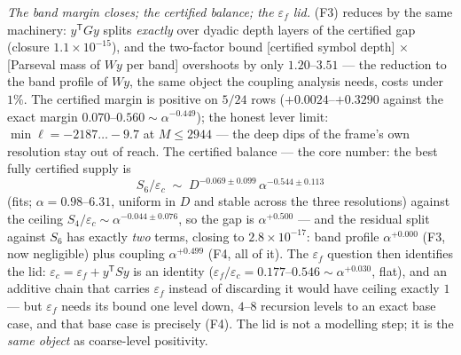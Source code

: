 \documentclass[11pt,a4paper]{article}
\begin{document}
\emph{The band margin closes; the certified balance; the $\varepsilon_f$ lid.} (F3) reduces
by the same machinery: $y^{\mathsf T}Gy$ splits \emph{exactly} over dyadic depth layers of
the certified gap (closure $1.1\times10^{-15}$), and the two-factor bound [certified symbol
depth] $\times$ [Parseval mass of $Wy$ per band] overshoots by only $1.20$--$3.51$ --- the
reduction to the band profile of $Wy$, the same object the coupling analysis needs, costs
under $1\%$. The certified margin is positive on $5/24$ rows ($+0.0024$--$+0.3290$ against
the exact margin $0.070$--$0.560\sim\alpha^{-0.449}$); the honest lever limit:
$\min\ell=-2187\ldots-9.7$ at $M\le2944$ --- the deep dips of the frame's own resolution
stay out of reach. The certified balance --- the core number: the best fully certified
supply is
\[
S_6/\varepsilon_c\;\sim\;D^{-0.069\pm0.099}\,\alpha^{-0.544\pm0.113}
\]
(fits; $\alpha=0.98$--$6.31$, uniform in $D$ and stable across the three resolutions)
against the ceiling $S_4/\varepsilon_c\sim\alpha^{-0.044\pm0.076}$, so the gap is
$\alpha^{+0.500}$ --- and the residual split against $S_6$ has exactly \emph{two} terms,
closing to $2.8\times10^{-17}$: band profile $\alpha^{+0.000}$ (F3, now negligible) plus
coupling $\alpha^{+0.499}$ (F4, all of it). The $\varepsilon_f$ question then identifies the
lid: $\varepsilon_c=\varepsilon_f+y^{\mathsf T}Sy$ is an identity
($\varepsilon_f/\varepsilon_c=0.177$--$0.546\sim\alpha^{+0.030}$, flat), and an additive
chain that carries $\varepsilon_f$ instead of discarding it would have ceiling exactly $1$
--- but $\varepsilon_f$ needs its bound one level down, $4$--$8$ recursion levels to an exact
base case, and that base case is precisely (F4). The lid is not a modelling step; it is the
\emph{same object} as coarse-level positivity.
\end{document}
